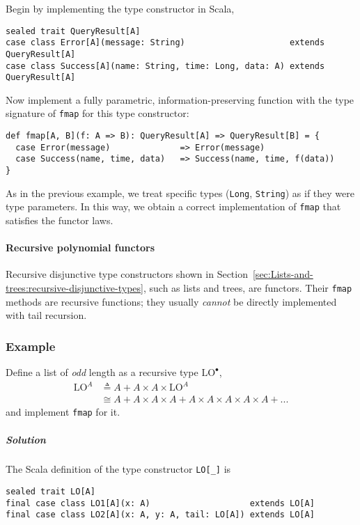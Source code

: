 Begin by implementing the type constructor in Scala,
\begin{lstlisting}
sealed trait QueryResult[A]
case class Error[A](message: String)                     extends QueryResult[A]
case class Success[A](name: String, time: Long, data: A) extends QueryResult[A]
\end{lstlisting}
Now implement a fully parametric, information-preserving function
with the type signature of \lstinline!fmap! for this type constructor:
\begin{lstlisting}
def fmap[A, B](f: A => B): QueryResult[A] => QueryResult[B] = {
  case Error(message)              => Error(message)
  case Success(name, time, data)   => Success(name, time, f(data))
}
\end{lstlisting}
As in the previous example, we treat specific types (\lstinline!Long!,
\lstinline!String!) as if they were type parameters. In this way,
we obtain a correct implementation of \lstinline!fmap! that satisfies
the functor laws.

\paragraph{Recursive polynomial functors}

Recursive disjunctive type constructors shown in Section~\ref{sec:Lists-and-trees:recursive-disjunctive-types},
such as lists and trees, are functors. Their \lstinline!fmap! methods
are recursive functions; they usually \emph{cannot} be directly implemented
with tail recursion. 

\subsubsection{Example }

Define a list of \emph{odd} length as a recursive type $\text{LO}^{\bullet}$,
\begin{align}
\text{LO}^{A} & \triangleq A+A\times A\times\text{LO}^{A}\label{eq:f-lo-def}\\
 & \cong A+A\times A\times A+A\times A\times A\times A\times A+...\nonumber 
\end{align}
and implement \lstinline!fmap! for it.

\subparagraph{Solution}

The Scala definition of the type constructor \lstinline!LO[_]! is

\begin{lstlisting}
sealed trait LO[A]
final case class LO1[A](x: A)                    extends LO[A]
final case class LO2[A](x: A, y: A, tail: LO[A]) extends LO[A]
\end{lstlisting}

